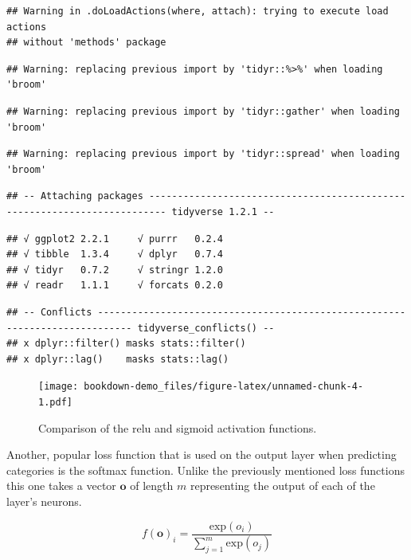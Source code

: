 \documentclass[]{book}
\theoremstyle{definition}
\theoremstyle{definition}
\theoremstyle{definition}
\theoremstyle{remark}
\let\BeginKnitrBlock\begin \let\EndKnitrBlock\end
\begin{document}
\begin{verbatim}
## Warning in .doLoadActions(where, attach): trying to execute load actions
## without 'methods' package
\end{verbatim}

\begin{verbatim}
## Warning: replacing previous import by 'tidyr::%>%' when loading 'broom'
\end{verbatim}

\begin{verbatim}
## Warning: replacing previous import by 'tidyr::gather' when loading 'broom'
\end{verbatim}

\begin{verbatim}
## Warning: replacing previous import by 'tidyr::spread' when loading 'broom'
\end{verbatim}

\begin{verbatim}
## -- Attaching packages ------------------------------------------------------------------------- tidyverse 1.2.1 --
\end{verbatim}

\begin{verbatim}
## √ ggplot2 2.2.1     √ purrr   0.2.4
## √ tibble  1.3.4     √ dplyr   0.7.4
## √ tidyr   0.7.2     √ stringr 1.2.0
## √ readr   1.1.1     √ forcats 0.2.0
\end{verbatim}

\begin{verbatim}
## -- Conflicts ---------------------------------------------------------------------------- tidyverse_conflicts() --
## x dplyr::filter() masks stats::filter()
## x dplyr::lag()    masks stats::lag()
\end{verbatim}

\begin{figure}
\centering
\texttt{[image: bookdown-demo\_files/figure-latex/unnamed-chunk-4-1.pdf]}
\caption{\label{fig:unnamed-chunk-4}Comparison of the relu and sigmoid
activation functions.}
\end{figure}

Another, popular loss function that is used on the output layer when
predicting categories is the softmax function. Unlike the previously
mentioned loss functions this one takes a vector \(\textbf{o}\) of
length \(m\) representing the output of each of the layer's neurons.

\BeginKnitrBlock{definition}[Softmax activation function.]
\protect\hypertarget{def:softmax}{}{\label{def:softmax} {}
}\[f(\textbf{o})_i = \frac{\text{exp}(o_i)}{\sum_{j = 1}^m \text{exp}(o_j)}\]
\EndKnitrBlock{definition}
\end{document}
